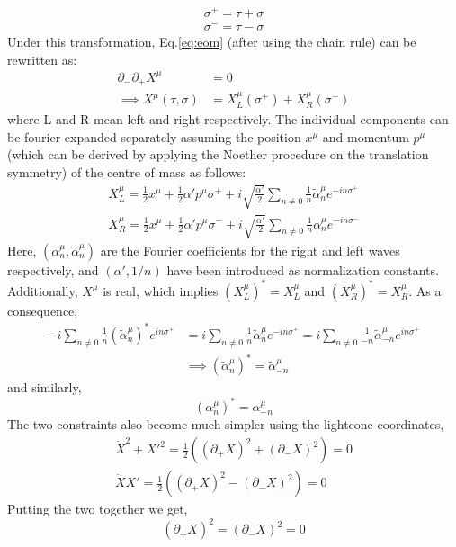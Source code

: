 \documentclass{article}
\begin{document}
\begin{align}
	\sigma^+ = \tau+\sigma\\
	\sigma^- = \tau-\sigma
\end{align}
Under this transformation, Eq.\eqref{eq:eom} (after using the chain rule) can be rewritten as:
\begin{align}
	\partial_-\partial_+X^\mu&=0\\
	\implies X^\mu(\tau,\sigma) &= X^\mu_L(\sigma^+)+X^\mu_R(\sigma^-) \label{eq:sol_LR}
\end{align}
where L and R mean left and right respectively. The individual components can be fourier expanded separately assuming the position $x^\mu$ and momentum $p^\mu$ (which can be derived by applying the Noether procedure on the translation symmetry) of the centre of mass as follows:
\begin{align}
X^\mu_L = \frac{1}{2}x^\mu+ \frac{1}{2}\alpha'p^\mu\sigma^++ i\sqrt{\frac{\alpha'}{2}}\sum_{n\neq0} \frac{1}{n}\tilde{\alpha}_n^\mu e^{-in\sigma^+}\\
	X^\mu_R = \frac{1}{2}x^\mu+ \frac{1}{2}\alpha'p^\mu\sigma^-+ i\sqrt{\frac{\alpha'}{2}}\sum_{n\neq0} \frac{1}{n}{\alpha}_n^\mu e^{-in\sigma^-}
\end{align}
Here, $(\alpha^\mu_n, \tilde{\alpha}^\mu_n)$ are the Fourier coefficients for the right and left waves respectively, and $(\alpha',1/n)$ have been introduced as normalization constants.  Additionally, $X^\mu$ is real, which implies $(X^\mu_L)^*=X^\mu_L$ and $(X^\mu_R)^*=X^\mu_R$. As a consequence,
\begin{align}
	-i\sum_{n\neq0}\frac{1}{n}(\tilde{\alpha}_n^\mu)^*e^{in\sigma^+} &= i\sum_{n\neq0}\frac{1}{n}\tilde{\alpha}_n^\mu e^{-in\sigma^+} = i\sum_{n\neq0}\frac{1}{-n}\tilde{\alpha}_{-n}^\mu e^{in\sigma^+}\\
	&\implies (\tilde{\alpha}_n^\mu)^* = \tilde{\alpha}_{-n}^\mu
\end{align}
and similarly,
\begin{equation}
	({\alpha}_n^\mu)^* = {\alpha}_{-n}^\mu
\end{equation}
The two constraints also become much simpler using the lightcone coordinates,
\begin{align}
	\dot{X}^2+X'^2 = \frac{1}{2}((\partial_+X)^2+(\partial_-X)^2)=0\\
	\dot{X}X' = \frac{1}{2}((\partial_+X)^2-(\partial_-X)^2)=0
\end{align}
Putting the two together we get,
\begin{equation}
	(\partial_+X)^2 = (\partial_-X)^2 = 0\label{eq:constraint}
\end{equation}
\end{document}
